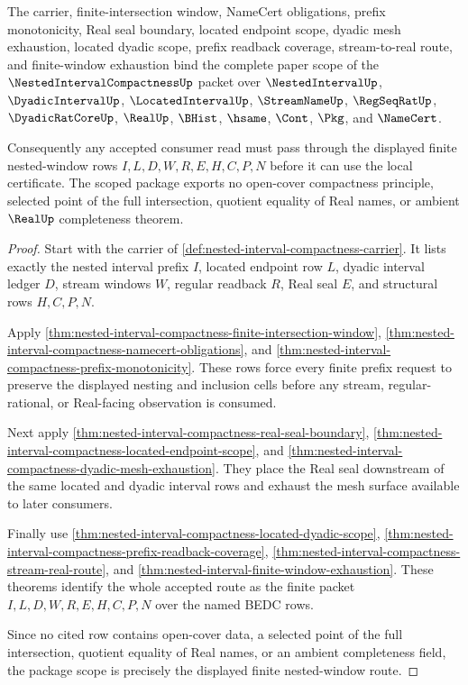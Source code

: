 \begin{theorem}
\label{thm:nested-interval-compactness-scope-package}
The carrier, finite-intersection window, NameCert obligations, prefix monotonicity, Real seal boundary, located endpoint scope, dyadic mesh exhaustion, located dyadic scope, prefix readback coverage, stream-to-real route, and finite-window exhaustion bind the complete paper scope of the $\NestedIntervalCompactnessUp$ packet over $\NestedIntervalUp$, $\DyadicIntervalUp$, $\LocatedIntervalUp$, $\StreamNameUp$, $\RegSeqRatUp$, $\DyadicRatCoreUp$, $\RealUp$, $\BHist$, $\hsame$, $\Cont$, $\Pkg$, and $\NameCert$.

Consequently any accepted consumer read must pass through the displayed finite nested-window rows $I,L,D,W,R,E,H,C,P,N$ before it can use the local certificate. The scoped package exports no open-cover compactness principle, selected point of the full intersection, quotient equality of Real names, or ambient $\RealUp$ completeness theorem.
\end{theorem}
\begin{proof}
Start with the carrier of \autoref{def:nested-interval-compactness-carrier}. It lists exactly the nested interval prefix $I$, located endpoint row $L$, dyadic interval ledger $D$, stream windows $W$, regular readback $R$, Real seal $E$, and structural rows $H,C,P,N$.

Apply \autoref{thm:nested-interval-compactness-finite-intersection-window}, \autoref{thm:nested-interval-compactness-namecert-obligations}, and \autoref{thm:nested-interval-compactness-prefix-monotonicity}. These rows force every finite prefix request to preserve the displayed nesting and inclusion cells before any stream, regular-rational, or Real-facing observation is consumed.

Next apply \autoref{thm:nested-interval-compactness-real-seal-boundary}, \autoref{thm:nested-interval-compactness-located-endpoint-scope}, and \autoref{thm:nested-interval-compactness-dyadic-mesh-exhaustion}. They place the Real seal downstream of the same located and dyadic interval rows and exhaust the mesh surface available to later consumers.

Finally use \autoref{thm:nested-interval-compactness-located-dyadic-scope}, \autoref{thm:nested-interval-compactness-prefix-readback-coverage}, \autoref{thm:nested-interval-compactness-stream-real-route}, and \autoref{thm:nested-interval-finite-window-exhaustion}. These theorems identify the whole accepted route as the finite packet $I,L,D,W,R,E,H,C,P,N$ over the named BEDC rows.

Since no cited row contains open-cover data, a selected point of the full intersection, quotient equality of Real names, or an ambient completeness field, the package scope is precisely the displayed finite nested-window route.
\end{proof}

